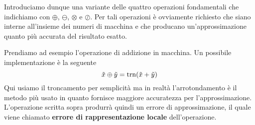 Introduciamo dunque una variante delle quattro operazioni fondamentali che indichiamo con $\oplus$, $\ominus$,
$\otimes$ e $\oslash$. Per tali operazioni è ovviamente richiesto che siano interne all'insieme dei numeri
di macchina e che producano un'approssimazione quanto più accurata del risultato esatto.

Prendiamo ad esempio l'operazione di addizione in macchina. Un possibile implementazione è la seguente
\[ \tilde{x} \oplus \tilde{y} = \operatorname{trn}(\tilde{x} + \tilde{y}) \]
Qui usiamo il troncamento per semplicità ma in realtà l'arrotondamento è il metodo più usato in quanto fornisce
maggiore accuratezza per l'approssimazione. L'operazione scritta sopra produrrà quindi un errore di
approssimazione, il quale viene chiamato \textbf{errore di rappresentazione locale} dell'operazione.

